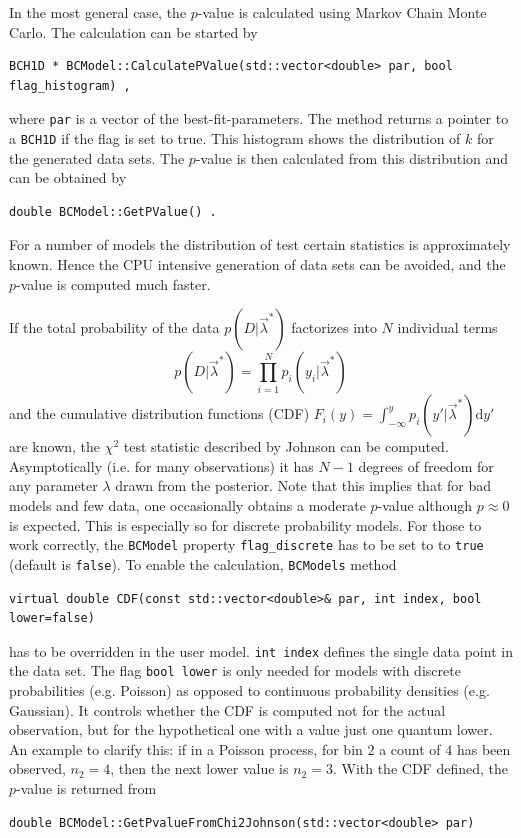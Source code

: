 \documentclass[11pt, a4paper]{article}
\begin{document}
\noindent 
In the most general case, the $p$-value is calculated using Markov
Chain Monte Carlo. The calculation can be started by 
%
\begin{verbatim}
BCH1D * BCModel::CalculatePValue(std::vector<double> par, bool flag_histogram) , 
\end{verbatim}
%
\noindent 
where \verb|par| is a vector of the best-fit-parameters. The method
returns a pointer to a  \verb|BCH1D| 
if the flag is set to true. This histogram shows the distribution
of $k$ for the generated data sets.  
The $p$-value is then calculated from this distribution and can be
obtained by
%
\begin{verbatim}
double BCModel::GetPValue() . 
\end{verbatim} 

For a number of models the distribution of test certain statistics 
is approximately known. Hence the CPU intensive generation of data sets can be avoided, 
and the $p$-value is computed much faster. 

If the total probability of the data $p\left(D|\vec{\lambda}^{*}\right)$
 factorizes into $N$ individual terms 
$$p\left(D|\vec{\lambda}^{*}\right) = \prod_{i=1}^N p_i\left(y_i|\vec{\lambda}^{*}\right)$$
and the cumulative distribution functions (CDF) 
$F_i(y)= \int_{-\infty}^{y} p_i(y'|\vec{\lambda}^{*}) \mathrm{d }y'$ 
are known, the  $\chi^2$ test statistic described by Johnson \cite{Johnson_pValue} can be computed. 
Asymptotically (i.e. for many observations) it has $N-1$ 
degrees of freedom for any parameter $\lambda$
drawn from the posterior. Note that this implies that for bad models and few
data, one occasionally obtains a moderate $p$-value although $p\approx 0 $
is expected. This is especially so
for discrete probability models. For those to work correctly, the \texttt{BCModel} 
property \verb|flag_discrete| has to be set to to \texttt{true} (default is \texttt{false}).
To enable the calculation, \verb|BCModels| method 
\begin{verbatim}
virtual double CDF(const std::vector<double>& par, int index, bool lower=false)
\end{verbatim}
has to be overridden in the user model.  \verb|int index| defines the single 
data point in the data set. The flag \verb|bool lower| is only needed 
for models with discrete probabilities (e.g. Poisson) as opposed to
continuous probability densities (e.g. Gaussian). It controls whether 
the CDF is computed not for the actual observation, but for the 
hypothetical one with a value just one quantum lower. An example to clarify this:
if in a Poisson process, for bin $2$ a count of $4$ has been observed, $n_2=4$,
then the next lower value is $n_2=3$. 
With the CDF defined, the $p$-value is returned from 
\begin{verbatim}
double BCModel::GetPvalueFromChi2Johnson(std::vector<double> par)
\end{verbatim}
\end{document}
